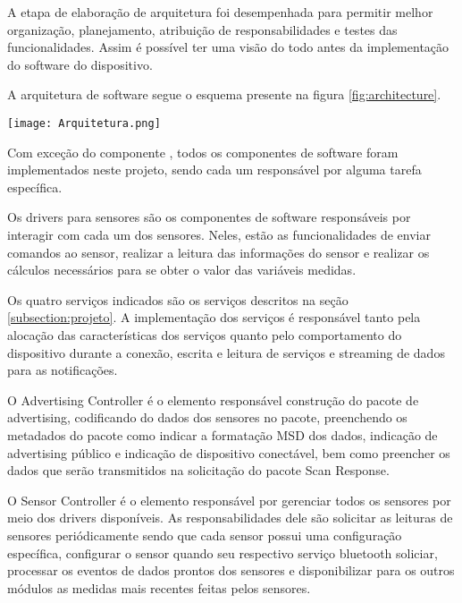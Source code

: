 

A etapa de elaboração de arquitetura foi desempenhada para permitir melhor
organização, planejamento, atribuição de responsabilidades e testes das
funcionalidades.
Assim é possível ter uma visão do todo antes da implementação do software do dispositivo.

A arquitetura de software segue o esquema presente na figura
\ref{fig:architecture}.

\begin{center}
	\centering 
	\texttt{[image: Arquitetura.png]}
	\label{fig:architecture}
\end{center} 

Com exceção do componente , todos os componentes de
software foram implementados neste projeto, sendo cada um responsável por alguma
tarefa específica.

Os drivers para sensores são os componentes de software responsáveis por
interagir com cada um dos sensores. Neles, estão as funcionalidades de enviar
comandos ao sensor, realizar a leitura das informações do sensor e realizar os
cálculos necessários para se obter o valor das variáveis medidas.

Os quatro serviços indicados são os serviços descritos na seção
\ref{subsection:projeto}. A implementação dos serviços é responsável tanto pela
alocação das características dos serviços quanto pelo comportamento do
dispositivo durante a conexão, escrita e leitura de serviços e streaming de
dados para as notificações.

O Advertising Controller é o elemento responsável construção do pacote de
advertising, codificando do dados dos sensores no pacote, preenchendo os
metadados do pacote como indicar a formatação MSD dos dados, indicação de
advertising público e indicação de dispositivo conectável, bem como preencher os
dados que serão transmitidos na solicitação do pacote Scan Response.

O Sensor Controller é o elemento responsável por gerenciar todos os sensores por
meio dos drivers disponíveis. As responsabilidades dele são solicitar as
leituras de sensores periódicamente sendo que cada sensor possui uma
configuração específica, configurar o sensor quando seu respectivo serviço
bluetooth soliciar, processar os eventos de dados prontos dos sensores e
disponibilizar para os outros módulos as medidas mais recentes feitas
pelos sensores.

